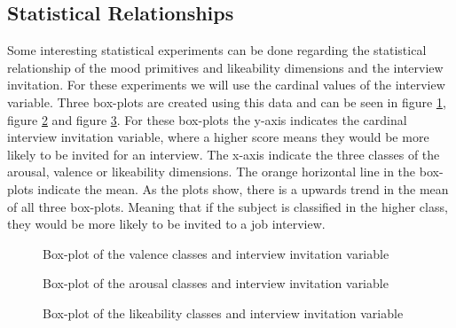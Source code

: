 \subsection{Statistical Relationships}

Some interesting statistical experiments can be done regarding the statistical relationship of the mood primitives and likeability dimensions and the interview invitation. For these experiments we will use the cardinal values of the interview variable. Three box-plots are created using this data and can be seen in figure \ref{fig:boxplotval}, figure \ref{fig:boxplotaro} and figure \ref{fig:boxplotlike}. For these box-plots the y-axis indicates the cardinal interview invitation variable, where a higher score means they would be more likely to be invited for an interview. The x-axis indicate the three classes of the arousal, valence or likeability dimensions. The orange horizontal line in the box-plots indicate the mean. As the plots show, there is a upwards trend in the mean of all three box-plots. Meaning that if the subject is classified in the higher class, they would be more likely to be invited to a job interview.

\begin{figure}[h]
  \centering
  
  \caption{Box-plot of the valence classes and interview invitation variable}
  \label{fig:boxplotval}
\end{figure}

\begin{figure}[h]
  \centering
  
  \caption{Box-plot of the arousal classes and interview invitation variable}
  \label{fig:boxplotaro}
\end{figure}

\begin{figure}[h]
  \centering
  
  \caption{Box-plot of the likeability classes and interview invitation variable}
  \label{fig:boxplotlike}
\end{figure}

